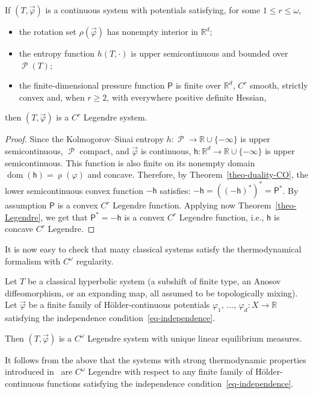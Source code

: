 \documentclass[AHL, Unicode, longabstracts,published]{cedram}
\theoremstyle{plain}
\theoremstyle{plain}
\newcommand\vpot{\vec\pot}
\newcommand\dom{\operatorname{dom}}
\newcommand\Prob{{\operatorname{\mathscr{P}}}}
\newcommand{\rs}{\operatorname{\rho}}
\newcommand{\hf}{\mathsf{h}}
\newcommand{\Pf}{\mathsf{P}}
\newcommand{\pot}{\varphi}
\newcommand*\8{\infty}
\newcommand\RR{\mathbb{R}}
\begin{document}
\begin{prop}\label{prop:nlem0}
If $(T,\vpot)$ is a continuous system with potentials satisfying, for some $1\leq r\leq\omega$,
\begin{itemize}
\item the rotation set $\rho(\vpot)$ has nonempty interior {in $\RR^d$};
\item the entropy function $h(T,\cdot)$ is upper semicontinuous and bounded over $\Prob(T)$;
\item the finite-dimensional pressure {function} $\Pf$ is finite over $\RR^d$, $C^r$ smooth, strictly convex and, when $r\ge 2$, with everywhere positive definite Hessian,
\end{itemize}
then $(T,\vpot)$ is a $C^r$ Legendre system.
\end{prop}

\begin{proof}
Since the Kolmogorov--Sinai entropy $h:\Prob\to\RR\cup\{-\infty\}$ is upper semicontinuous, $\Prob$ compact, and $\vpot$ is continuous, $\hf:\RR^d\to\RR\cup\{-\infty\}$ is upper semicontinuous. This function is also finite on its nonempty domain $\dom(\hf)=\rs(\pot)$ and concave. Therefore, by Theorem~\ref{theo-duality-CO}, the lower semicontinuous convex function $-\hf$ satisfies: $-\hf=((-\hf)^*)^*=\Pf^*$. By assumption $\Pf$ is a convex $C^r$ Legendre function. Applying now Theorem~\ref{theo-Legendre}, we get that $\Pf^*=-\hf$ is a convex $C^r$ Legendre function, i.e., $\hf$ is concave $C^r$ Legendre.
\end{proof}

It is now easy to check that many classical systems satisfy the thermodynamical formalism with $C^\omega$ regularity.



\begin{coro}\label{coro3.12}
Let $T$ be a classical hyperbolic system (a subshift of finite type, an Anosov diffeomorphism, or an expanding map, all assumed to be topologically mixing). Let $\vpot$ be a finite family of H\"older-continuous potentials $\pot_1,\,\dots,\,\pot_d:X\to\RR$ satisfying the independence condition~\eqref{eq-independence}.

Then $(T,\vpot)$ is a $C^\omega$ Legendre system with unique linear equilibrium measures.
\end{coro}



\begin{rema}\label{rem-KW2015}
It follows from the above that the systems with strong thermodynamic properties introduced in~\cite{KW2015} are $C^\omega$ Legendre with respect to any finite family of H\"older-continuous functions satisfying the independence condition~\eqref{eq-independence}.
\end{rema}
\end{document}
